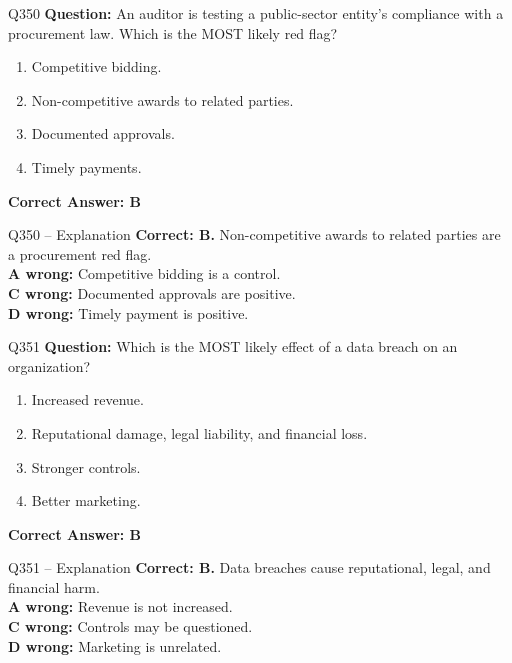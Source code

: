 \documentclass[aspectratio=169,10pt]{beamer}
\begin{document}
	\begin{frame}[t]{Q350}
		\small
		\textbf{Question:} An auditor is testing a public-sector entity's compliance with a procurement law. Which is the MOST likely red flag?
		\begin{enumerate}[label=\Alph*.,itemsep=1pt,topsep=2pt]
			\item Competitive bidding.
			\item Non-competitive awards to related parties.
			\item Documented approvals.
			\item Timely payments.
		\end{enumerate}
		\vspace{4pt}
		\textbf{Correct Answer: B}
	\end{frame}
	
	\begin{frame}[t]{Q350 -- Explanation}
		\small
		\textbf{Correct: B.} Non-competitive awards to related parties are a procurement red flag. \\[4pt]
		\textbf{A wrong:} Competitive bidding is a control. \\[2pt]
		\textbf{C wrong:} Documented approvals are positive. \\[2pt]
		\textbf{D wrong:} Timely payment is positive.
	\end{frame}
	
	\begin{frame}[t]{Q351}
		\small
		\textbf{Question:} Which is the MOST likely effect of a data breach on an organization?
		\begin{enumerate}[label=\Alph*.,itemsep=1pt,topsep=2pt]
			\item Increased revenue.
			\item Reputational damage, legal liability, and financial loss.
			\item Stronger controls.
			\item Better marketing.
		\end{enumerate}
		\vspace{4pt}
		\textbf{Correct Answer: B}
	\end{frame}
	
	\begin{frame}[t]{Q351 -- Explanation}
		\small
		\textbf{Correct: B.} Data breaches cause reputational, legal, and financial harm. \\[4pt]
		\textbf{A wrong:} Revenue is not increased. \\[2pt]
		\textbf{C wrong:} Controls may be questioned. \\[2pt]
		\textbf{D wrong:} Marketing is unrelated.
	\end{frame}
	
\end{document}
